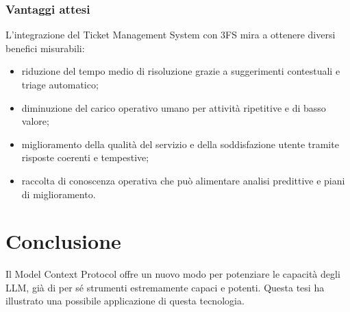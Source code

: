 \subsubsection{Vantaggi attesi}
L'integrazione del Ticket Management System con 3FS{\textsuperscript{\tiny\textcopyright}} mira a ottenere diversi benefici misurabili:
\begin{itemize}
    \item riduzione del tempo medio di risoluzione grazie a suggerimenti contestuali e triage automatico;
    \item diminuzione del carico operativo umano per attività ripetitive e di basso valore;
    \item miglioramento della qualità del servizio e della soddisfazione utente tramite risposte coerenti e tempestive;
    \item raccolta di conoscenza operativa che può alimentare analisi predittive e piani di miglioramento.
\end{itemize}

\section{Conclusione}
Il Model Context Protocol offre un nuovo modo per potenziare le capacità degli LLM, già di per sé strumenti estremamente capaci e potenti.
Questa tesi ha illustrato una possibile applicazione di questa tecnologia.